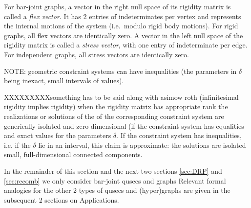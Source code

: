 For bar-joint graphs,  
a vector  in the right null space of its rigidity matrix
is called a {\em flex vector}. 
It has 2 entries of indeterminates per vertex and represents the internal motions of the system
(i.e.\ modulo rigid body motions).
For rigid graphs, all flex vectors are  identically zero. 
A vector in the left null space of the rigidity matrix
is called a {\em stress vector}, with one entry of indeterminate per edge.
For independent graphs, all stress vectors are identically zero. 








NOTE: geometric constraint systems can have inequalities (the parameters
in $\delta$ being inexact, small intervals of values).

XXXXXXXXXsomething has to be said 
along with asimow roth (infinitesimal rigidity 
implies rigidity)
when the rigidity matrix has appropriate rank
the realizations or solutions of the 
of the corresponding constraint system 
are generically isolated and zero-dimensional 
(if the constraint system has equalities and exact 
values for the parameters $\delta$.
If the constraint system has inequalities, i.e, 
if the $\delta$ lie in an interval,
this claim is approximate: 
the solutions are isolated small, full-dimensional  connected components.




In the remainder of this section and the next two sections 
\ref{sec:DRP} and \ref{sec:recomb} 
we only consider bar-joint qusecs and graphs
Relevant formal analogies  for the other 2 types of qusecs and (hyper)graphs 
are given in the subsequent 2 sections on Applications.

